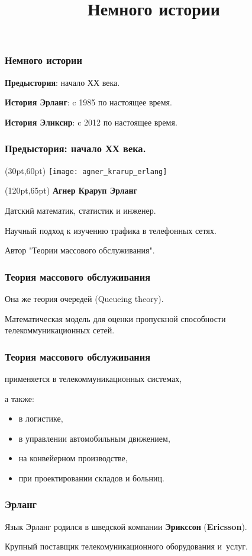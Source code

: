 \documentclass[10pt]{beamer}
\title{Немного истории}
\begin{document}
\begin{frame}
  \frametitle{Немного истории}
  \textbf{Предыстория}: начало ХХ века.
  \par \bigskip
  \textbf{История Эрланг}: c 1985 по настоящее время.
  \par \bigskip
  \textbf{История Эликсир}: c 2012 по настоящее время.
\end{frame}


\begin{frame}
  \frametitle{Предыстория: начало ХХ века.}
  \begin{textblock*}{70pt}(30pt,60pt)
    \texttt{[image: agner\_krarup\_erlang]}
  \end{textblock*}
  \begin{textblock*}{220pt}(120pt,65pt)
    \textbf{Агнер Краруп Эрланг}
    \par \bigskip
    Датский математик, статистик и инженер.
    \par \bigskip
    Научный подход к изучению трафика в телефонных сетях.
    \par \bigskip
    Автор "Теории массового обслуживания".
  \end{textblock*}
\end{frame}

\begin{frame}
  \frametitle{Теория массового обслуживания}
  Она же теория очередей (Queueing theory).
  \par \bigskip
  Математическая модель для оценки пропускной способности телекоммуникационных сетей.
\end{frame}

\begin{frame}
  \frametitle{Теория массового обслуживания}
  применяется в телекоммуникационных системах,
  \par \bigskip
  а также:
  \begin{itemize}
  \item в логистике,
  \item в управлении автомобильным движением,
  \item на конвейерном производстве,
  \item при проектировании складов и больниц.
  \end{itemize}
\end{frame}

\begin{frame}
  \frametitle{Эрланг}
  Язык Эрланг родился в шведской компании \textbf{Эрикссон} (\textbf{Ericsson}).
  \par \bigskip
  Крупный поставщик телекомуникационного оборудования и~услуг.
\end{frame}
\end{document}
